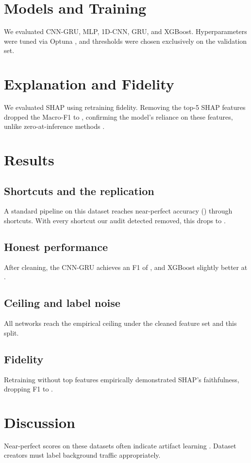 \documentclass[conference]{IEEEtran}
\begin{document}
\section{Models and Training}
We evaluated CNN-GRU, MLP, 1D-CNN, GRU, and XGBoost. Hyperparameters were tuned via Optuna \cite{akiba2019optuna}, and thresholds were chosen exclusively on the validation set.

\section{Explanation and Fidelity}
We evaluated SHAP \cite{lundberg2017unified} using retraining fidelity. Removing the top-5 SHAP features dropped the Macro-F1 to \FidTopFive, confirming the model's reliance on these features, unlike zero-at-inference methods \cite{udurume2026shap}.

\section{Results}
\subsection{Shortcuts and the replication}
A standard pipeline on this dataset reaches near-perfect accuracy (\FerragRepAcc) through shortcuts. With every shortcut our audit detected removed, this drops to \FerragCleanAcc.
\subsection{Honest performance}
After cleaning, the CNN-GRU achieves an F1 of \CnnGruFone, and XGBoost slightly better at \XgbFone.
\subsection{Ceiling and label noise}
All networks reach the empirical ceiling under the cleaned feature set and this split.
\subsection{Fidelity}
Retraining without top features empirically demonstrated SHAP's faithfulness, dropping F1 to \FidTopFive.

\section{Discussion}
Near-perfect scores on these datasets often indicate artifact learning \cite{engelen2021trouble}. Dataset creators must label background traffic appropriately.
\end{document}
